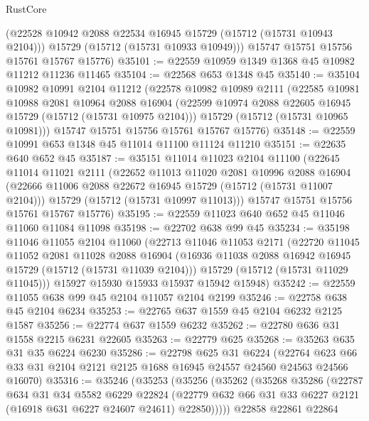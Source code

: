 \begin{lexlean}{RustCore}
\begin{coremodule}
        (@22528 @10942 @2088 @22534 @16945 @15729 (@15712 (@15731 @10943 @2104)))
        @15729
        (@15712 (@15731 @10933 @10949)))
      @15747
      @15751
      @15756
      @15761
      @15767
      @15776)
@35101 := @22559 @10959 @1349 @1368 @45 @10982 @11212 @11236 @11465
@35104 := @22568 @653 @1348 @45
@35140 := @35104
    @10982
    @10991
    @2104
    @11212
    (@22578
      @10982
      @10989
      @2111
      (@22585
        @10981
        @10988
        @2081
        @10964
        @2088
        @16904
        (@22599 @10974 @2088 @22605 @16945 @15729 (@15712 (@15731 @10975 @2104)))
        @15729
        (@15712 (@15731 @10965 @10981)))
      @15747
      @15751
      @15756
      @15761
      @15767
      @15776)
@35148 := @22559 @10991 @653 @1348 @45 @11014 @11100 @11124 @11210
@35151 := @22635 @640 @652 @45
@35187 := @35151
    @11014
    @11023
    @2104
    @11100
    (@22645
      @11014
      @11021
      @2111
      (@22652
        @11013
        @11020
        @2081
        @10996
        @2088
        @16904
        (@22666 @11006 @2088 @22672 @16945 @15729 (@15712 (@15731 @11007 @2104)))
        @15729
        (@15712 (@15731 @10997 @11013)))
      @15747
      @15751
      @15756
      @15761
      @15767
      @15776)
@35195 := @22559 @11023 @640 @652 @45 @11046 @11060 @11084 @11098
@35198 := @22702 @638 @99 @45
@35234 := @35198
    @11046
    @11055
    @2104
    @11060
    (@22713
      @11046
      @11053
      @2171
      (@22720
        @11045
        @11052
        @2081
        @11028
        @2088
        @16904
        (@16936 @11038 @2088 @16942 @16945 @15729 (@15712 (@15731 @11039 @2104)))
        @15729
        (@15712 (@15731 @11029 @11045)))
      @15927
      @15930
      @15933
      @15937
      @15942
      @15948)
@35242 := @22559 @11055 @638 @99 @45 @2104 @11057 @2104 @2199
@35246 := @22758 @638 @45 @2104 @6234
@35253 := @22765 @637 @1559 @45 @2104 @6232 @2125 @1587
@35256 := @22774 @637 @1559 @6232
@35262 := @22780 @636 @31 @1558 @2215 @6231 @22605
@35263 := @22779 @625
@35268 := @35263 @635 @31 @35 @6224 @6230
@35286 := @22798
    @625
    @31
    @6224
    (@22764 @623 @66 @33 @31 @2104 @2121 @2125 @1688 @16945 @24557 @24560 @24563 @24566 @16070)
@35316 := @35246
    (@35253
      (@35256
        (@35262
          (@35268
            @35286
            (@22787
              @634
              @31
              @34
              @5582
              @6229
              @22824
              (@22779 @632 @66 @31 @33 @6227 @2121 (@16918 @631 @6227 @24607 @24611) @22850)))))
      @22858
      @22861
      @22864

\end{coremodule}
\end{lexlean}

